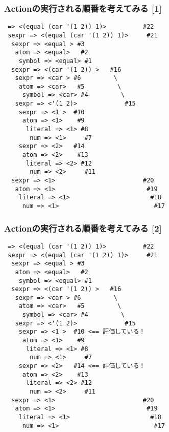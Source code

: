 \documentclass[14pt,dvipdfm,trans]{beamer}
\begin{document}
\begin{frame}[fragile]
 \frametitle{Actionの実行される順番を考えてみる [1] }
\begin{lstlisting}
 => <(equal (car '(1 2)) 1)>          #22
 sexpr => <(equal (car '(1 2)) 1)>     #21
  sexpr => <equal > #3
   atom => <equal>   #2
    symbol => <equal> #1
  sexpr => <(car '(1 2)) >   #16
   sexpr => <car > #6         \
    atom => <car>   #5         \
     symbol => <car> #4         \
   sexpr => <'(1 2)>             #15
    sexpr => <1 >  #10
     atom => <1>    #9
      literal => <1> #8
       num => <1>     #7
    sexpr => <2>   #14
     atom => <2>    #13
      literal => <2> #12
       num => <2>     #11
  sexpr => <1>                        #20
   atom => <1>                         #19
    literal => <1>                      #18
     num => <1>                          #17
\end{lstlisting}
\end{frame}

\begin{frame}[fragile]
 \frametitle{Actionの実行される順番を考えてみる [2] }
\begin{lstlisting}
 => <(equal (car '(1 2)) 1)>          #22
 sexpr => <(equal (car '(1 2)) 1)>     #21
  sexpr => <equal > #3
   atom => <equal>   #2
    symbol => <equal> #1
  sexpr => <(car '(1 2)) >   #16
   sexpr => <car > #6         \
    atom => <car>   #5         \
     symbol => <car> #4         \
   sexpr => <'(1 2)>             #15
    sexpr => <1 >  #10 <== 評価している！
     atom => <1>    #9
      literal => <1> #8
       num => <1>     #7
    sexpr => <2>   #14 <== 評価している！
     atom => <2>    #13
      literal => <2> #12
       num => <2>     #11
  sexpr => <1>                        #20
   atom => <1>                         #19
    literal => <1>                      #18
     num => <1>                          #17
\end{lstlisting}
\end{frame}
\end{document}
